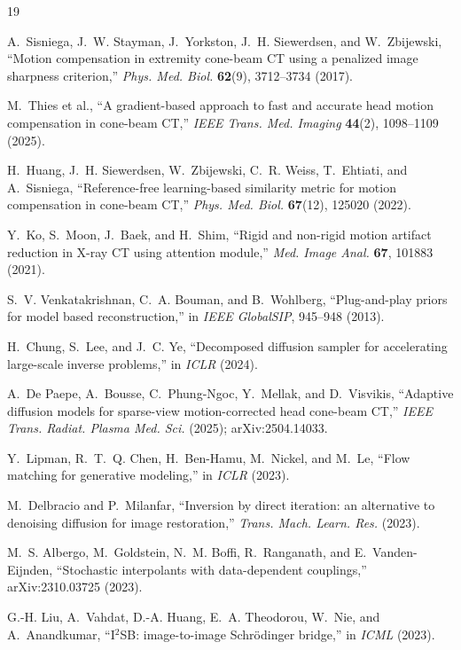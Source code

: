 \documentclass[11pt]{article}
\begin{document}
\begin{thebibliography}{19}\small

 A.~Sisniega, J.~W. Stayman, J.~Yorkston, J.~H. Siewerdsen, and
W.~Zbijewski, ``Motion compensation in extremity cone-beam CT using a penalized image
sharpness criterion,'' \emph{Phys. Med. Biol.} \textbf{62}(9), 3712--3734 (2017).

 M.~Thies et al., ``A gradient-based approach to fast and accurate head
motion compensation in cone-beam CT,'' \emph{IEEE Trans. Med. Imaging} \textbf{44}(2),
1098--1109 (2025).

 H.~Huang, J.~H. Siewerdsen, W.~Zbijewski, C.~R. Weiss, T.~Ehtiati, and
A.~Sisniega, ``Reference-free learning-based similarity metric for motion compensation in
cone-beam CT,'' \emph{Phys. Med. Biol.} \textbf{67}(12), 125020 (2022).

 Y.~Ko, S.~Moon, J.~Baek, and H.~Shim, ``Rigid and non-rigid motion artifact
reduction in X-ray CT using attention module,'' \emph{Med. Image Anal.} \textbf{67}, 101883
(2021).

 S.~V. Venkatakrishnan, C.~A. Bouman, and B.~Wohlberg, ``Plug-and-play priors
for model based reconstruction,'' in \emph{IEEE GlobalSIP}, 945--948 (2013).

 H.~Chung, S.~Lee, and J.~C. Ye, ``Decomposed diffusion sampler for
accelerating large-scale inverse problems,'' in \emph{ICLR} (2024).

 A.~De Paepe, A.~Bousse, C.~Phung-Ngoc, Y.~Mellak, and D.~Visvikis,
``Adaptive diffusion models for sparse-view motion-corrected head cone-beam CT,''
\emph{IEEE Trans. Radiat. Plasma Med. Sci.} (2025); arXiv:2504.14033.

 Y.~Lipman, R.~T.~Q. Chen, H.~Ben-Hamu, M.~Nickel, and M.~Le, ``Flow
matching for generative modeling,'' in \emph{ICLR} (2023).

 M.~Delbracio and P.~Milanfar, ``Inversion by direct iteration: an
alternative to denoising diffusion for image restoration,'' \emph{Trans. Mach. Learn. Res.}
(2023).

 M.~S. Albergo, M.~Goldstein, N.~M. Boffi, R.~Ranganath, and
E.~Vanden-Eijnden, ``Stochastic interpolants with data-dependent couplings,'' arXiv:2310.03725
(2023).

 G.-H. Liu, A.~Vahdat, D.-A. Huang, E.~A. Theodorou, W.~Nie, and
A.~Anandkumar, ``I$^2$SB: image-to-image Schr\"odinger bridge,'' in \emph{ICML} (2023).


\end{thebibliography}
\end{document}
